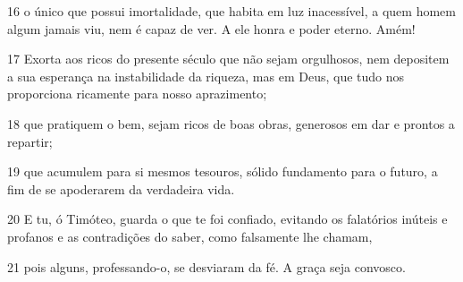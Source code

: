 \par 16 o único que possui imortalidade, que habita em luz inacessível, a quem homem algum jamais viu, nem é capaz de ver. A ele honra e poder eterno. Amém!
\par 17 Exorta aos ricos do presente século que não sejam orgulhosos, nem depositem a sua esperança na instabilidade da riqueza, mas em Deus, que tudo nos proporciona ricamente para nosso aprazimento;
\par 18 que pratiquem o bem, sejam ricos de boas obras, generosos em dar e prontos a repartir;
\par 19 que acumulem para si mesmos tesouros, sólido fundamento para o futuro, a fim de se apoderarem da verdadeira vida.
\par 20 E tu, ó Timóteo, guarda o que te foi confiado, evitando os falatórios inúteis e profanos e as contradições do saber, como falsamente lhe chamam,
\par 21 pois alguns, professando-o, se desviaram da fé. A graça seja convosco.


